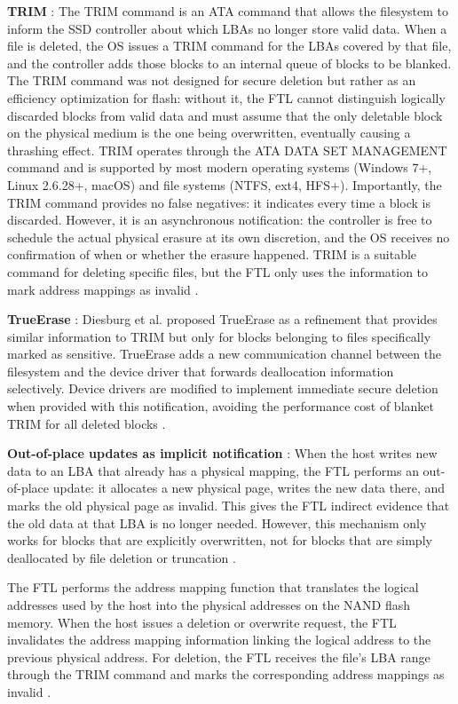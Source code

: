 \textbf{TRIM} : The TRIM command is an ATA command that allows the filesystem to inform the SSD 
controller about which LBAs no longer store valid data. When a file is deleted, the OS issues a TRIM 
command for the LBAs covered by that file, and the controller adds those blocks to an internal queue 
of blocks to be blanked. The TRIM command was not designed for secure deletion but rather as an 
efficiency optimization for flash: without it, the FTL cannot distinguish logically discarded blocks 
from valid data and must assume that the only deletable block on the physical medium is the one being 
overwritten, eventually causing a thrashing effect. TRIM operates through the ATA DATA SET MANAGEMENT 
command and is supported by most modern operating systems (Windows 7+, Linux 2.6.28+, macOS) and file 
systems (NTFS, ext4, HFS+). Importantly, the TRIM command provides no false negatives: it indicates 
every time a block is discarded. However, it is an asynchronous notification: the controller is free 
to schedule the actual physical erasure at its own discretion, and the OS receives no confirmation of 
when or whether the erasure happened. TRIM is a suitable command for deleting specific files, but the 
FTL only uses the information to mark address mappings as invalid \cite{reardon2013sok,trimwearlevelling2019}.

\textbf{TrueErase} : Diesburg et al. proposed TrueErase as a refinement that provides similar 
information to TRIM but only for blocks belonging to files specifically marked as sensitive. 
TrueErase adds a new communication channel between the filesystem and the device driver that 
forwards deallocation information selectively. Device drivers are modified to implement immediate 
secure deletion when provided with this notification, avoiding the performance cost of blanket TRIM 
for all deleted blocks \cite{reardon2013sok}.

\textbf{Out-of-place updates as implicit notification} : When the host writes new data to an LBA that 
already has a physical mapping, the FTL performs an out-of-place update: it allocates a new physical 
page, writes the new data there, and marks the old physical page as invalid. This gives the FTL 
indirect evidence that the old data at that LBA is no longer needed. However, this mechanism only 
works for blocks that are explicitly overwritten, not for blocks that are simply deallocated by file 
deletion or truncation \cite{antiforensics2016}.

The FTL performs the address mapping function that translates the logical addresses used by the host 
into the physical addresses on the NAND flash memory. When the host issues a deletion or overwrite 
request, the FTL invalidates the address mapping information linking the logical address to the 
previous physical address. For deletion, the FTL receives the file's LBA range through the TRIM 
command and marks the corresponding address mappings as invalid \cite{antiforensics2016}.


